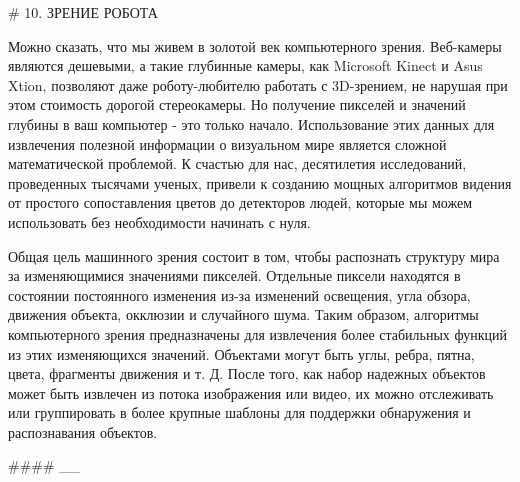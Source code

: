 # 10. ЗРЕНИЕ РОБОТА


Можно сказать, что мы живем в золотой век компьютерного зрения. Веб-камеры являются дешевыми, а такие глубинные камеры, как Microsoft Kinect и Asus Xtion, позволяют даже роботу-любителю работать с 3D-зрением, не нарушая при этом стоимость дорогой стереокамеры. Но получение пикселей и значений глубины в ваш компьютер - это только начало. Использование этих данных для извлечения полезной информации о визуальном мире является сложной математической проблемой. К счастью для нас, десятилетия исследований, проведенных тысячами ученых, привели к созданию мощных алгоритмов видения от простого сопоставления цветов до детекторов людей, которые мы можем использовать без необходимости начинать с нуля.

Общая цель машинного зрения состоит в том, чтобы распознать структуру мира за изменяющимися значениями пикселей. Отдельные пиксели находятся в состоянии постоянного изменения из-за изменений освещения, угла обзора, движения объекта, окклюзии и случайного шума. Таким образом, алгоритмы компьютерного зрения предназначены для извлечения более стабильных функций из этих изменяющихся значений. Объектами могут быть углы, ребра, пятна, цвета, фрагменты движения и т. Д. После того, как набор надежных объектов может быть извлечен из потока изображения или видео, их можно отслеживать или группировать в более крупные шаблоны для поддержки обнаружения и распознавания объектов.

#### \_\_

